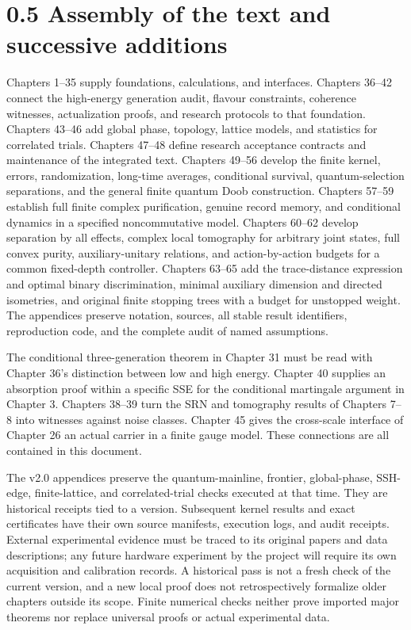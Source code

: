 \documentclass[
  11pt,
  oneside]{book}
\begin{document}
\section{0.5 Assembly of the text and successive additions}

Chapters 1--35 supply foundations, calculations, and interfaces.
Chapters 36--42 connect the high-energy generation audit, flavour
constraints, coherence witnesses, actualization proofs, and research
protocols to that foundation. Chapters 43--46 add global phase,
topology, lattice models, and statistics for correlated trials. Chapters
47--48 define research acceptance contracts and maintenance of the
integrated text. Chapters 49--56 develop the finite kernel, errors,
randomization, long-time averages, conditional survival,
quantum-selection separations, and the general finite quantum Doob
construction. Chapters 57--59 establish full finite complex
purification, genuine record memory, and conditional dynamics in a
specified noncommutative model. Chapters 60--62 develop separation by
all effects, complex local tomography for arbitrary joint states, full
convex purity, auxiliary-unitary relations, and action-by-action budgets
for a common fixed-depth controller. Chapters 63--65 add the
trace-distance expression and optimal binary discrimination, minimal
auxiliary dimension and directed isometries, and original finite
stopping trees with a budget for unstopped weight. The appendices
preserve notation, sources, all stable result identifiers, reproduction
code, and the complete audit of named assumptions.

The conditional three-generation theorem in Chapter 31 must be read with
Chapter 36's distinction between low and high energy. Chapter 40
supplies an absorption proof within a specific SSE for the conditional
martingale argument in Chapter 3. Chapters 38--39 turn the SRN and
tomography results of Chapters 7--8 into witnesses against noise
classes. Chapter 45 gives the cross-scale interface of Chapter 26 an
actual carrier in a finite gauge model. These connections are all
contained in this document.

The v2.0 appendices preserve the quantum-mainline, frontier,
global-phase, SSH-edge, finite-lattice, and correlated-trial checks
executed at that time. They are historical receipts tied to a version.
Subsequent kernel results and exact certificates have their own source
manifests, execution logs, and audit receipts. External experimental
evidence must be traced to its original papers and data descriptions;
any future hardware experiment by the project will require its own
acquisition and calibration records. A historical pass is not a fresh
check of the current version, and a new local proof does not
retrospectively formalize older chapters outside its scope. Finite
numerical checks neither prove imported major theorems nor replace
universal proofs or actual experimental data.
\end{document}

